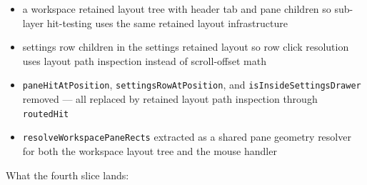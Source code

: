 \begin{itemize}
\tightlist
\item
  a workspace retained layout tree with header tab and pane children so sub-layer hit-testing uses the same retained layout infrastructure
\item
  settings row children in the settings retained layout so row click resolution uses layout path inspection instead of scroll-offset math
\item
  \texttt{p\allowbreak{}a\allowbreak{}n\allowbreak{}e\allowbreak{}H\allowbreak{}i\allowbreak{}t\allowbreak{}A\allowbreak{}t\allowbreak{}P\allowbreak{}o\allowbreak{}s\allowbreak{}i\allowbreak{}t\allowbreak{}i\allowbreak{}o\allowbreak{}n}, \texttt{s\allowbreak{}e\allowbreak{}t\allowbreak{}t\allowbreak{}i\allowbreak{}n\allowbreak{}g\allowbreak{}s\allowbreak{}R\allowbreak{}o\allowbreak{}w\allowbreak{}A\allowbreak{}t\allowbreak{}P\allowbreak{}o\allowbreak{}s\allowbreak{}i\allowbreak{}t\allowbreak{}i\allowbreak{}o\allowbreak{}n}, and \texttt{i\allowbreak{}s\allowbreak{}I\allowbreak{}n\allowbreak{}s\allowbreak{}i\allowbreak{}d\allowbreak{}e\allowbreak{}S\allowbreak{}e\allowbreak{}t\allowbreak{}t\allowbreak{}i\allowbreak{}n\allowbreak{}g\allowbreak{}s\allowbreak{}D\allowbreak{}r\allowbreak{}a\allowbreak{}w\allowbreak{}e\allowbreak{}r} removed --- all replaced by retained layout path inspection through \texttt{r\allowbreak{}o\allowbreak{}u\allowbreak{}t\allowbreak{}e\allowbreak{}d\allowbreak{}H\allowbreak{}i\allowbreak{}t}
\item
  \texttt{r\allowbreak{}e\allowbreak{}s\allowbreak{}o\allowbreak{}l\allowbreak{}v\allowbreak{}e\allowbreak{}W\allowbreak{}o\allowbreak{}r\allowbreak{}k\allowbreak{}s\allowbreak{}p\allowbreak{}a\allowbreak{}c\allowbreak{}e\allowbreak{}P\allowbreak{}a\allowbreak{}n\allowbreak{}e\allowbreak{}R\allowbreak{}e\allowbreak{}c\allowbreak{}t\allowbreak{}s} extracted as a shared pane geometry resolver for both the workspace layout tree and the mouse handler
\end{itemize}

What the fourth slice lands:

